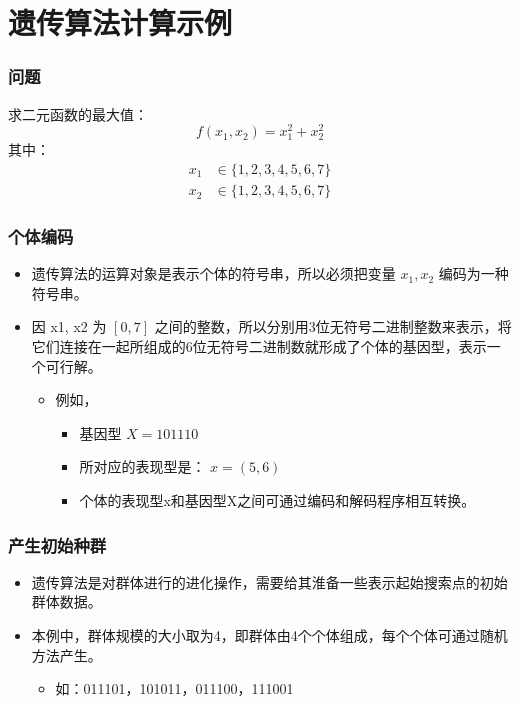 \documentclass{beamer}
\begin{document}
\section{遗传算法计算示例}
\label{sec-2}

\begin{frame}
\frametitle{问题}
\label{sec-2-1}

    求二元函数的最大值：
\[ f(x_1,x_2) =x_1^2+x_2^2 \]
其中：
\begin{align*}
   x_1 &\in \{1,2,3,4,5,6,7\} \\
   x_2 &\in \{1,2,3,4,5,6,7\} 
\end{align*}
\end{frame}
\begin{frame}
\frametitle{个体编码}
\label{sec-2-2}

\begin{itemize}
\item <2-> 遗传算法的运算对象是表示个体的符号串，所以必须把变量 $x_1,x_2$ 编码为一种符号串。
\item <3-> 因 x1, x2 为 $[0,7]$ 之间的整数，所以分别用3位无符号二进制整数来表示，将它们连接在一起所组成的6位无符号二进制数就形成了个体的基因型，表示一个可行解。
\begin{itemize}
\item <4-> 例如，
\begin{itemize}
\item 基因型  $X=101110$
\item 所对应的表现型是： $x=(5,6)$
\item <5-> 个体的表现型x和基因型X之间可通过编码和解码程序相互转换。
\end{itemize}
\end{itemize}
\end{itemize}
\end{frame}
\begin{frame}
\frametitle{产生初始种群}
\label{sec-2-3}

\begin{itemize}
\item <2-> 遗传算法是对群体进行的进化操作，需要给其淮备一些表示起始搜索点的初始群体数据。
\item <3-> 本例中，群体规模的大小取为4，即群体由4个个体组成，每个个体可通过随机方法产生。
\begin{itemize}
\item 如：011101，101011，011100，111001
\end{itemize}
\end{itemize}
         
\end{frame}
\end{document}
